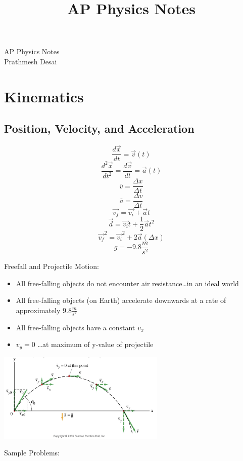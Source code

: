 \documentclass{article}
\title{AP Physics Notes}
\begin{document}
\begingroup  
  \centering
  \LARGE AP Physics Notes\\[1ex]
  \large Prathmesh Desai\par
\endgroup

\section{Kinematics}
\subsection{Position, Velocity, and Acceleration}
\begin{multicols}{2}

\[\frac{d\vec{x}}{dt}=\vec{v}(t)\]
\[\frac{d^2\vec{x}}{dt^2}=\frac{d\vec{v}}{dt}=\vec{a}(t)\]
\[\bar{v}=\frac{\Delta{x}}{\Delta{t}}\]
\[\bar{a}=\frac{\Delta{v}}{\Delta{t}}\]
\[\vec{v_f}=\vec{v_i}+\vec{a}t\]
\[\vec{d}=\vec{v_i}t+\frac{1}{2}\vec{a}t^2\]
\[\vec{v_f}^2=\vec{v_i}^2+2\vec{a}(\Delta{x})\]
\[g=-9.8\frac{m}{s^2}\]

\columnbreak

Freefall and Projectile Motion:
\vspace{3mm}
\begin{itemize}
\item All free-falling objects do not encounter air resistance\ldots in an ideal world
\item All free-falling objects (on Earth) accelerate downwards at a rate of approximately $9.8\frac{m}{s^2}$
\item All free-falling objects have a constant $v_x$
\item $v_y=0$ \ldots at maximum of y-value of projectile
\end{itemize}

\vspace{2ex}
\includegraphics[width=8cm]{ProjectileMotion.jpg}

\end{multicols}

Sample Problems: \vspace{1em}
\end{document}
